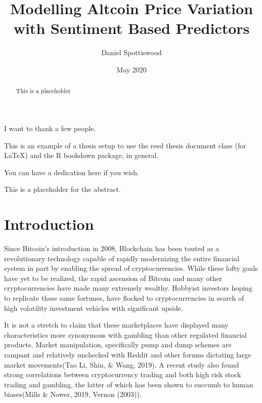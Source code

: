 \documentclass[12pt,twoside]{dukestatscithesis}
\title{Modelling Altcoin Price Variation with Sentiment Based Predictors}
\author{Daniel Spottiswood}
\date{May 2020}
\begin{document}
  \maketitle

\frontmatter %
\pagestyle{empty} %
  \begin{acknowledgements}
    I want to thank a few people.
  \end{acknowledgements}
  \begin{preface}
    This is an example of a thesis setup to use the reed thesis document
    class (for LaTeX) and the R bookdown package, in general.
  \end{preface}
  \hypersetup{linkcolor=black}
  \setcounter{tocdepth}{2}
  \tableofcontents

  \listoftables

  \listoffigures
  \begin{abstract}
    This is a placeholder
  \end{abstract}
  \begin{dedication}
    You can have a dedication here if you wish.
  \end{dedication}
\mainmatter %
\pagestyle{fancyplain} %

This is a placeholder for the abstract.

\chapter*{Introduction}\label{introduction}

Since Bitcoin's introduction in 2008, Blockchain has been touted as a
revolutionary technology capable of rapidly modernizing the entire
financial system in part by enabling the spread of cryptocurrencies.
While these lofty goals have yet to be realized, the rapid ascension of
Bitcoin and many other cryptocurrencies have made many extremely
wealthy. Hobbyist investors hoping to replicate these same fortunes,
have flocked to cryptocurrencies in search of high volatility investment
vehicles with significant upside.

It is not a stretch to claim that these marketplaces have displayed many
characteristics more synonymous with gambling than other regulated
financial products. Market manipulation, specifically pump and dump
schemes are rampant and relatively unchecked with Reddit and other
forums dictating large market movements(Tao Li, Shin, \& Wang, 2019). A
recent study also found strong correlations between cryptocurrency
trading and both high risk stock trading and gambling, the latter of
which has been shown to succumb to human biases(Mills \& Nower, 2019,
Vernon (2003)).
\end{document}
